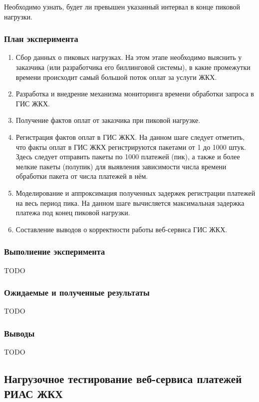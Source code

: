 Необходимо узнать, будет ли превышен указанный интервал в конце пиковой нагрузки.

\subsubsection*{План эксперимента}

\begin{enumerate}
	\item Сбор данных о пиковых нагрузках. На этом этапе необходимо выяснить у заказчика (или разработчика его биллинговой системы), в какие промежутки времени происходит самый большой поток оплат за услуги ЖКХ.
	\item Разработка и внедрение механизма мониторинга времени обработки запроса в ГИС ЖКХ.
	\item Получение фактов оплат от заказчика при пиковой нагрузке.
	\item Регистрация фактов оплат в ГИС ЖКХ. На данном шаге следует отметить, что факты оплат в ГИС ЖКХ регистрируются пакетами от 1 до 1000 штук. Здесь следует отправить пакеты по 1000 платежей (пик), а также и более мелкие пакеты (полупик) для выявления зависимости числа времени обработки пакета от числа платежей в нём.
	\item Моделирование и аппроксимация полученных задержек регистрации платежей на весь период пика. На данном шаге вычисляется максимальная задержка платежа под конец пиковой нагрузки.
	\item Составление выводов о корректности работы веб-сервиса ГИС ЖКХ.
\end{enumerate}

\subsubsection*{Выполнение эксперимента}

TODO

\subsubsection*{Ожидаемые и полученные результаты}

TODO

\subsubsection*{Выводы}

TODO

\subsection{Нагрузочное тестирование веб-сервиса платежей РИАС ЖКХ}

